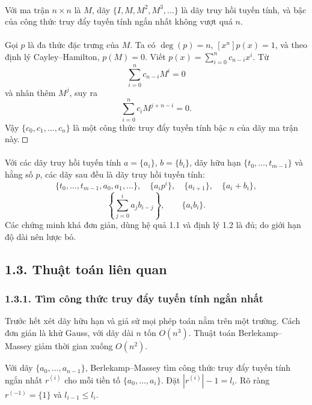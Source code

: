 \documentclass[11pt]{article}
\newcommand{\square}{\mathord{\vcenter{\hrule height .5pt
  \hbox{\vrule width .5pt height 5pt\kern5pt\vrule width .5pt}
  \hrule height .5pt}}}
\begin{document}
\paragraph{}
Với ma trận \(n\times n\) là \(M\), dãy \(\{I,M,M^2,M^3,\ldots\}\) là dãy
truy hồi tuyến tính, và bậc của công thức truy đẩy tuyến tính ngắn nhất không
vượt quá \(n\).

\paragraph{}
Gọi \(p\) là đa thức đặc trưng của \(M\). Ta có \(\deg(p)=n\),
\([x^n]p(x)=1\), và theo định lý Cayley--Hamilton, \(p(M)=0\). Viết
\(p(x)=\sum_{i=0}^{n}c_{n-i}x^i\). Từ
\[
  \sum_{i=0}^{n}c_{n-i}M^i=0
\]
và nhân thêm \(M^j\), suy ra
\[
  \sum_{i=0}^{n}c_iM^{j+n-i}=0.
\]
Vậy \(\{c_0,c_1,\ldots,c_n\}\) là một công thức truy đẩy tuyến tính bậc \(n\)
của dãy ma trận này. \(\square\)

\paragraph{}
Với các dãy truy hồi tuyến tính \(a=\{a_i\}\), \(b=\{b_i\}\), dãy hữu hạn
\(\{t_0,\ldots,t_{m-1}\}\) và hằng số \(p\), các dãy sau đều là dãy truy hồi
tuyến tính:
\[
\{t_0,\ldots,t_{m-1},a_0,a_1,\ldots\},\quad
\{a_i p^i\},\quad \{a_{i+1}\},\quad \{a_i+b_i\},
\]
\[
  \left\{\sum_{j=0}^{i}a_jb_{i-j}\right\},\qquad \{a_i b_i\}.
\]
Các chứng minh khá đơn giản, dùng hệ quả 1.1 và định lý 1.2 là đủ; do giới
hạn độ dài nên lược bỏ.

\subsection*{1.3. Thuật toán liên quan}

\subsubsection*{1.3.1. Tìm công thức truy đẩy tuyến tính ngắn nhất}

Trước hết xét dãy hữu hạn và giả sử mọi phép toán nằm trên một trường. Cách
đơn giản là khử Gauss, với dãy dài \(n\) tốn \(O(n^3)\). Thuật toán
Berlekamp--Massey giảm thời gian xuống \(O(n^2)\).

Với dãy \(\{a_0,\ldots,a_{n-1}\}\), Berlekamp--Massey tìm công thức truy đẩy
tuyến tính ngắn nhất \(r^{(i)}\) cho mỗi tiền tố \(\{a_0,\ldots,a_i\}\). Đặt
\(|r^{(i)}|-1=l_i\). Rõ ràng \(r^{(-1)}=\{1\}\) và \(l_{i-1}\le l_i\).
\end{document}

